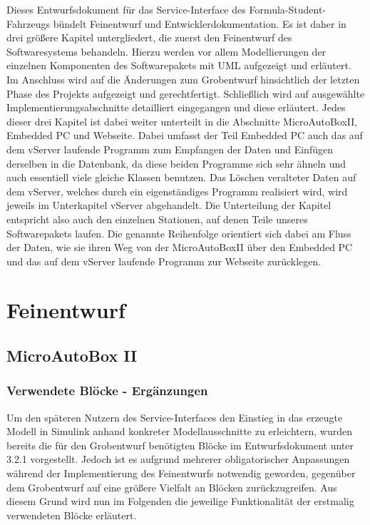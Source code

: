 \documentclass[fontsize = 12pt, paper = a4]{scrreprt}
\begin{document}
Dieses Entwurfsdokument für das Service-Interface des Formula-Student-Fahrzeugs bündelt Feinentwurf und Entwicklerdokumentation.
Es ist daher in drei größere Kapitel untergliedert, die zuerst den Feinentwurf des Softwaresystems behandeln. Hierzu werden vor allem Modellierungen der einzelnen Komponenten des Softwarepakets mit UML aufgezeigt und erläutert.
Im Anschluss wird auf die Änderungen zum Grobentwurf hinsichtlich der letzten Phase des Projekts aufgezeigt und gerechtfertigt. Schließlich wird auf ausgewählte Implementierungsabschnitte detailliert eingegangen und diese erläutert.
Jedes dieser drei Kapitel ist dabei weiter unterteilt in die Abschnitte MicroAutoBoxII, Embedded PC und Webseite. Dabei umfasst der Teil Embedded PC auch das auf dem vServer laufende Programm zum Empfangen der Daten und Einfügen derselben in die Datenbank, da diese beiden Programme sich sehr ähneln und auch essentiell viele gleiche Klassen benutzen. Das Löschen veralteter Daten auf dem vServer, welches durch ein eigenständiges Programm realisiert wird, wird jeweils im Unterkapitel vServer abgehandelt. Die Unterteilung der Kapitel entspricht also auch den einzelnen Stationen, auf denen Teile unseres Softwarepakets laufen. Die genannte Reihenfolge orientiert sich dabei am Fluss der Daten, wie sie ihren Weg von der MicroAutoBoxII über den Embedded PC und das auf dem vServer laufende Programm zur Webseite zurücklegen.


\chapter{Feinentwurf}


\section{MicroAutoBox II}

\subsection{Verwendete Blöcke - Ergänzungen}

Um den späteren Nutzern des Service-Interfaces den Einstieg in das erzeugte Modell in Simulink anhand konkreter Modellausschnitte zu erleichtern, wurden bereits die für den Grobentwurf benötigten Blöcke im Entwurfsdokument unter 3.2.1 vorgestellt. Jedoch ist es aufgrund mehrerer obligatorischer Anpassungen während der Implementierung des Feinentwurfs notwendig geworden, gegenüber dem Grobentwurf auf eine größere Vielfalt an Blöcken zurückzugreifen. Aus diesem Grund wird nun im Folgenden die jeweilige Funktionalität der erstmalig verwendeten Blöcke erläutert.
\end{document}
